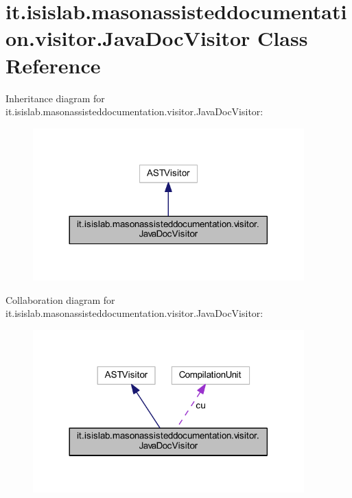 \hypertarget{classit_1_1isislab_1_1masonassisteddocumentation_1_1visitor_1_1_java_doc_visitor}{\section{it.\-isislab.\-masonassisteddocumentation.\-visitor.\-Java\-Doc\-Visitor Class Reference}
\label{classit_1_1isislab_1_1masonassisteddocumentation_1_1visitor_1_1_java_doc_visitor}
}


Inheritance diagram for it.\-isislab.\-masonassisteddocumentation.\-visitor.\-Java\-Doc\-Visitor\-:\nopagebreak
\begin{figure}[H]
\begin{center}
\leavevmode
\includegraphics[width=296pt]{classit_1_1isislab_1_1masonassisteddocumentation_1_1visitor_1_1_java_doc_visitor__inherit__graph}
\end{center}
\end{figure}


Collaboration diagram for it.\-isislab.\-masonassisteddocumentation.\-visitor.\-Java\-Doc\-Visitor\-:\nopagebreak
\begin{figure}[H]
\begin{center}
\leavevmode
\includegraphics[width=296pt]{classit_1_1isislab_1_1masonassisteddocumentation_1_1visitor_1_1_java_doc_visitor__coll__graph}
\end{center}
\end{figure}

